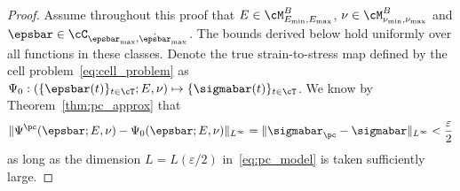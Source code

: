 \documentclass[letterpaper,11pt]{article}
\begin{document}
\begin{proof}
    Assume throughout this proof that $E \in \cM_{E_{\min}, E_{\max}}^B$, $\nu \in \cM_{\nu_{\min}, \nu_{\max}}^B$ and $\epsbar \in \cC_{\epsbar_{\max}, \dot{\epsbar}_{\max}}$. The bounds derived below hold uniformly over all functions in these classes. Denote the true strain-to-stress map defined by the cell problem~\eqref{eq:cell_problem} as $\Psi_0: (\{\epsbar(t)\}_{t\in\cT}; E, \nu) \mapsto \{\sigmabar(t)\}_{t \in \cT}$. We know by Theorem~\ref{thm:pc_approx} that
    \begin{equation}\label{eq:psi_pc_dagger_diff}
        \|\Psi^{\pc}(\epsbar; E, \nu) - \Psi_0(\epsbar; E, \nu)\|_{L^\infty} = \|\sigmabar_{\pc} - \sigmabar\|_{L^\infty} < \frac{\varepsilon}{2}
    \end{equation}
    as long as the dimension $L = L(\varepsilon/2)$ in~\eqref{eq:pc_model} is taken sufficiently large.
    

\end{proof}
\end{document}
